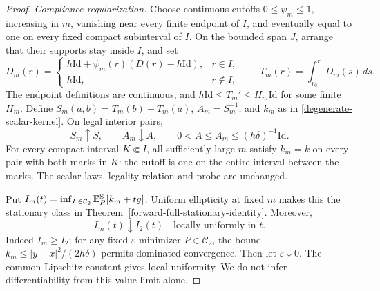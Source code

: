 \documentclass[11pt,reqno]{amsart}
\theoremstyle{definition}
\theoremstyle{remark}
\numberwithin{equation}{section}
\newcommand{\E}{\mathbb E}
\begin{document}
\begin{proof}
\emph{Compliance regularization.}
Choose continuous cutoffs \(0\le\psi_m\le1\), increasing in \(m\),
vanishing near every finite endpoint of \(I\), and eventually equal
to one on every fixed compact subinterval of \(I\). On the bounded
span \(J\), arrange that their supports stay inside \(I\), and set
\begin{equation}
\label{degenerate-scalar-regularization}
 D_m(r)=
 \begin{cases}
 h\mathrm{Id}+\psi_m(r)(D(r)-h\mathrm{Id}),&r\in I,\\
 h\mathrm{Id},&r\notin I,
 \end{cases}
 \qquad T_m(r)=\int_{r_0}^rD_m(s)\,ds.
\end{equation}
The endpoint definitions are continuous, and
\(h\mathrm{Id}\le T_m'\le H_m\mathrm{Id}\) for some finite \(H_m\).
Define \(S_m(a,b)=T_m(b)-T_m(a)\), \(A_m=S_m^{-1}\), and \(k_m\)
as in \eqref{degenerate-scalar-kernel}. On legal interior pairs,
\begin{equation}
\label{degenerate-scalar-monotonicity}
 S_m\uparrow S,\qquad A_m\downarrow A,\qquad
       0<A\le A_m\le(h\delta)^{-1}\mathrm{Id}.
\end{equation}
For every compact interval \(K\Subset I\), all sufficiently large
\(m\) satisfy \(k_m=k\) on every pair with both marks in \(K\):
the cutoff is one on the entire interval between the marks.
The scalar laws, legality relation and probe are unchanged.

Put \(I_m(t)=\inf_{P\in\mathcal C_2}\E_P^{\rm S}[k_m+tg]\).
Uniform ellipticity at fixed \(m\) makes this the stationary class
in Theorem~\ref{forward-full-stationary-identity}. Moreover,
\begin{equation}
\label{degenerate-scalar-value-limit}
                  I_m(t)\downarrow I_2(t)
                  \quad\text{locally uniformly in }t.
\end{equation}
Indeed \(I_m\ge I_2\); for any fixed \(\varepsilon\)-minimizer
\(P\in\mathcal C_2\), the bound
\(k_m\le|y-x|^2/(2h\delta)\) permits dominated convergence.
Then let \(\varepsilon\downarrow0\). The common Lipschitz constant
gives local uniformity. We do not infer differentiability from this
value limit alone.


\end{proof}
\end{document}
